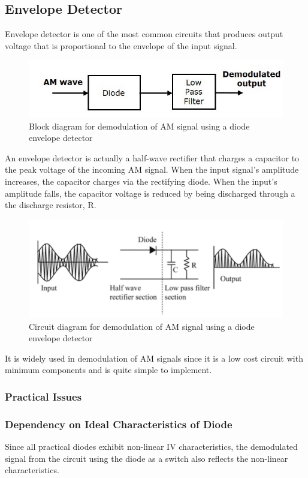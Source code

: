 \documentclass{lab_sheet}
\begin{document}
\subsection{Envelope Detector}
Envelope detector is one of the most common circuits that produces output voltage that is proportional to the envelope of the input signal. 
\begin{figure}[H]
    \centering
    \includegraphics{Figures/env.png}
    \caption{Block diagram for demodulation of AM signal using a diode envelope detector}
    \label{fig:env}
\end{figure}
An envelope detector is actually a half-wave rectifier that charges a capacitor to the peak voltage of the incoming AM signal. When the input signal’s amplitude increases, the capacitor charges via the rectifying diode. When the input's amplitude falls, the capacitor voltage is reduced
by being discharged through a the discharge resistor, R.
\begin{figure}[H]
    \centering
    \includegraphics{Figures/env2.png}
    \caption{Circuit diagram for demodulation of AM signal using a diode envelope detector}
    \label{fig:env2}
\end{figure}
It is widely used in demodulation of AM signals since it is a low cost circuit with minimum components and is quite simple to implement.
\subsubsection{Practical Issues} 
\subsubsection*{Dependency on Ideal Characteristics of Diode}
Since all practical diodes exhibit non-linear IV characteristics, the demodulated signal from the circuit using the diode as a switch also reflects the non-linear characteristics.
\end{document}
